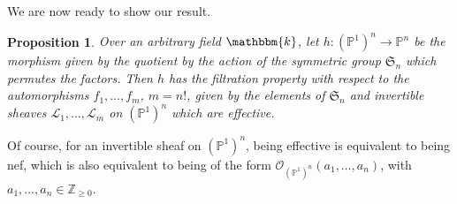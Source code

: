 \documentclass[11pt, reqno]{amsart}
\numberwithin{equation}{section}
\theoremstyle{plain}
\newtheorem{proposition}[theorem]{Proposition}
\theoremstyle{remark}
\theoremstyle{definition}
\theoremstyle{italicsname}
\newcommand{\cO}{\mathcal{O}}
\newcommand{\cL}{\mathcal{L}}
\newcommand{\fS}{\mathfrak{S}}
\newcommand{\KK}{\mathbbm{k}}
\def\ZZ{\ensuremath{\mathbb{Z}}}
\def\PP{\ensuremath{\mathbb{P}}}
\begin{document}
We are now ready to show our result.


\begin{proposition}\label{prop:P1ntoPnHasFiltrationProperty}
Over an arbitrary field $\KK$, 
let $h\colon(\PP^1)^n\to\PP^n$ be the morphism given by the quotient by the action of the symmetric group $\fS_n$ which permutes the factors. 
Then $h$ 
has the filtration property with respect to the automorphisms $f_1,\dots,f_m$, $m = n!$, given by the elements of $\fS_n$ and invertible sheaves $\cL_1, \dots, \cL_m$ on $(\PP^1)^n$ which are effective. 
\end{proposition}

Of course, for an invertible sheaf on $(\PP^1)^n$, being effective is equivalent to being nef, which is also equivalent to being of the form $\cO_{(\PP^1)^n}(a_1,\dots,a_n)$, with $a_1,\dots,a_n\in\ZZ_{\geq0}$.
\end{document}
